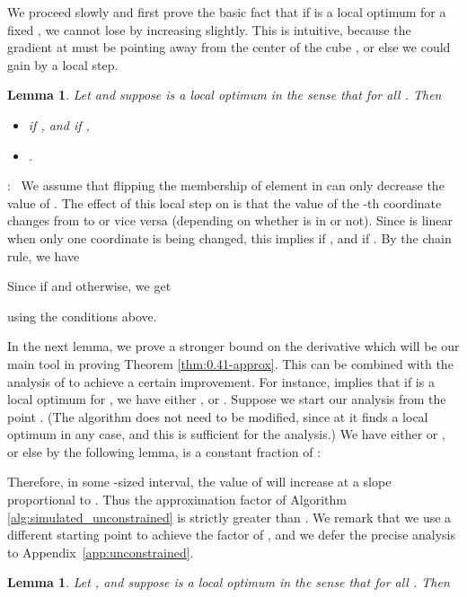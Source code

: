 \documentclass{article}[11pt]
\newtheorem{lemma}[theorem]{Lemma}
\renewenvironment{proof}{\noindent{\bf Proof}:~}{\\}
\begin{document}
We proceed slowly and first prove the basic fact that if  is
a local optimum for a fixed , we cannot lose by increasing  slightly.
This is intuitive, because the gradient  at 
must be pointing away from the center of the cube , or else we could gain
by a local step.

\begin{lemma}
\label{lem:positive-drift}
Let  and suppose  is a local optimum in the sense that
 for all . Then
\begin{itemize}
\item  if ,
and  if ,
\item .
\end{itemize}
\end{lemma}

\begin{proof}
We assume that flipping the membership of element  in  can only decrease the value
of . The effect of this local step on  is that the value of the -th coordinate
changes from  to  or vice versa (depending on whether  is in  or not).
Since  is linear when only one coordinate is being changed, this implies
 if , and  if .
By the chain rule, we have

Since  if  and  otherwise, we get

using the conditions above.
\end{proof}

In the next lemma, we prove a stronger bound on the derivative 
which will be our main tool in proving Theorem \ref{thm:0.41-approx}.
This can be combined with the analysis of \cite{FMV07} to achieve a certain improvement.
For instance, \cite{FMV07} implies that if  is a local optimum for ,
we have either , or . 
Suppose we start our analysis from the point . (The algorithm does not need
to be modified, since at  it finds a local optimum in any case, and this is
sufficient for the analysis.)
We have either  or ,
or else by the following lemma,  is a constant fraction of :

Therefore, in some -sized interval, the value of 
will increase at a slope proportional to . Thus the approximation factor of
 Algorithm \ref{alg:simulated_unconstrained} is strictly greater than .
We remark that we use a different starting point to achieve the factor of ,
and we defer the precise analysis to Appendix~\ref{app:unconstrained}.



\begin{lemma}
\label{lem:drift-bound}
Let ,  and suppose  is
a local optimum in the sense that 
 for all . Then

\end{lemma}
\end{document}
